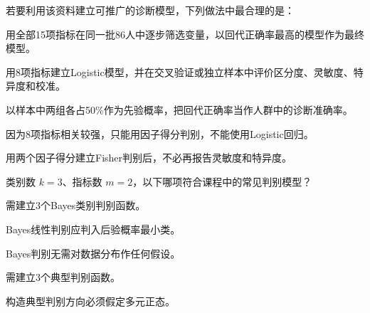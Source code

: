 \par\addvspace{6pt}\noindent\begin{minipage}{\linewidth}


若要利用该资料建立可推广的诊断模型，下列做法中最合理的是：

\begin{choices}

\item 用全部15项指标在同一批86人中逐步筛选变量，以回代正确率最高的模型作为最终模型。

\item 用8项指标建立Logistic模型，并在交叉验证或独立样本中评价区分度、灵敏度、特异度和校准。

\item 以样本中两组各占50\%作为先验概率，把回代正确率当作人群中的诊断准确率。

\item 因为8项指标相关较强，只能用因子得分判别，不能使用Logistic回归。

\item 用两个因子得分建立Fisher判别后，不必再报告灵敏度和特异度。

\end{choices}

\end{minipage}\par\vspace{4pt}

\par\addvspace{6pt}\noindent\begin{minipage}{\linewidth}


类别数 \(k=3\)、指标数 \(m=2\)，以下哪项符合课程中的常见判别模型？


\begin{choices}

\item 需建立3个Bayes类别判别函数。

\item Bayes线性判别应判入后验概率最小类。

\item Bayes判别无需对数据分布作任何假设。

\item 需建立3个典型判别函数。

\item 构造典型判别方向必须假定多元正态。

\end{choices}

\end{minipage}\par\vspace{4pt}


